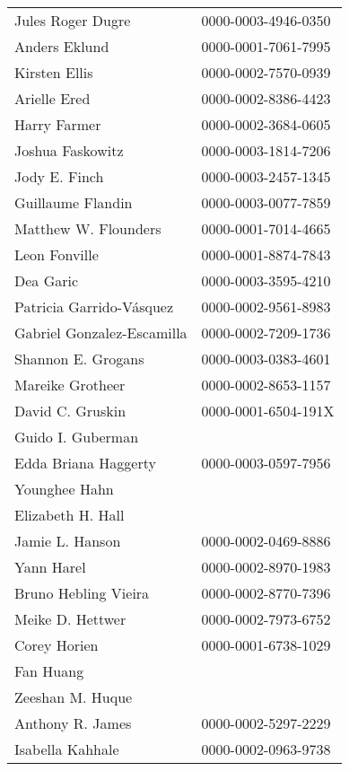 \begin{longtable}{ll}
         Jules Roger Dugre & 0000-0003-4946-0350 \\
             Anders Eklund & 0000-0001-7061-7995 \\
             Kirsten Ellis & 0000-0002-7570-0939 \\
              Arielle Ered & 0000-0002-8386-4423 \\
              Harry Farmer & 0000-0002-3684-0605 \\
          Joshua Faskowitz & 0000-0003-1814-7206 \\
             Jody E. Finch & 0000-0003-2457-1345 \\
         Guillaume Flandin & 0000-0003-0077-7859 \\
      Matthew W. Flounders & 0000-0001-7014-4665 \\
             Leon Fonville & 0000-0001-8874-7843 \\
                 Dea Garic & 0000-0003-3595-4210 \\
  Patricia Garrido-Vásquez & 0000-0002-9561-8983 \\
Gabriel Gonzalez-Escamilla & 0000-0002-7209-1736 \\
        Shannon E. Grogans & 0000-0003-0383-4601 \\
          Mareike Grotheer & 0000-0002-8653-1157 \\
          David C. Gruskin & 0000-0001-6504-191X \\
         Guido I. Guberman &                     \\
      Edda Briana Haggerty & 0000-0003-0597-7956 \\
             Younghee Hahn &                     \\
         Elizabeth H. Hall &                     \\
           Jamie L. Hanson & 0000-0002-0469-8886 \\
                Yann Harel & 0000-0002-8970-1983 \\
      Bruno Hebling Vieira & 0000-0002-8770-7396 \\
          Meike D. Hettwer & 0000-0002-7973-6752 \\
              Corey Horien & 0000-0001-6738-1029 \\
                 Fan Huang &                     \\
          Zeeshan M. Huque &                     \\
          Anthony R. James & 0000-0002-5297-2229 \\
          Isabella Kahhale & 0000-0002-0963-9738 \\

\end{longtable}
